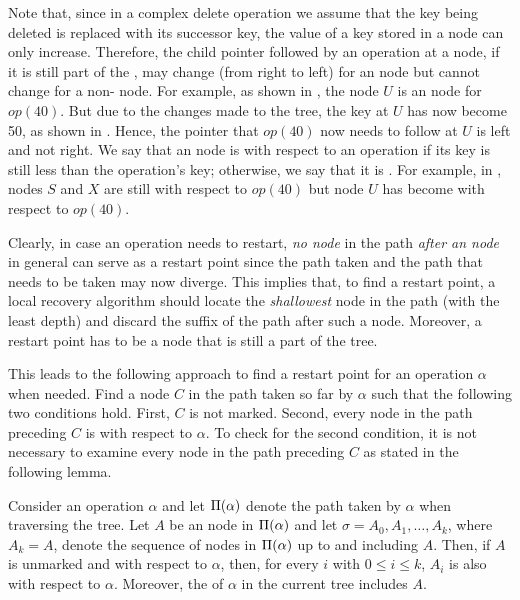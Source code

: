 Note that, since in a complex delete operation we assume that the key being deleted is replaced with its successor key, the value of a key stored in a node can only increase. Therefore, the child pointer followed by an operation at a node, if it is still part of the \accesspath, may change (from right to left) for an \myanchor{} node but cannot change for a non-\myanchor{} node. For example, as shown in , the node $U$ is an \myanchor{} node for $op(40)$. But due to the changes made to the tree, the key at $U$ has now become 50, as shown in . Hence, the pointer that $op(40)$ now needs to follow at $U$ is left and not right. We say that an \myanchor
{} node is \emph{\myconsistent} with respect to an operation if its key is still less than the operation's key; otherwise, we say that it is \emph{\myinconsistent}. For example, in , \myanchor{} nodes $S$ and $X$ are still \myconsistent{} with respect to $op(40)$ but node $U$ has become \myinconsistent{} with respect to $op(40)$. 

Clearly, in case an operation needs to restart, \emph{no node} in the path \emph{after an \myinconsistent{} \myanchor{} node} in general can serve as a restart point since the path taken and the path that needs to be taken may now diverge. This implies that, to find a restart point, a local recovery algorithm should locate the \emph{shallowest} \myinconsistent{} \myanchor{} node in the path (with the least depth) and discard the suffix of the path after such a node. Moreover, a restart point has to be a node that is still a part of the tree. 

This leads to the following approach to find a restart point for an operation $\alpha$ when needed. Find a node $C$ in the path taken so far by $\alpha$ such that the following two conditions hold. First, $C$ is not marked. Second, every \myanchor{} node in the path preceding $C$ is \myconsistent{} with respect to $\alpha$. To check for the second condition, it is not necessary to examine every \myanchor{} node in the path preceding $C$ as stated in the following lemma. 

\begin{lemma}
\label{lem:consistent}
Consider an operation $\alpha$ and let $\Pi(\alpha)$ denote the path 
taken by $\alpha$ when traversing the tree. 
Let $A$ be an \myanchor{} node in $\Pi(\alpha)$ and let 
$\sigma = A_0, A_1, \ldots, A_k$, where $A_k = A$, 
denote the sequence of \myanchor{} nodes in $\Pi(\alpha)$ up 
to and including $A$. Then, if $A$ is unmarked and \myconsistent{} with 
respect to $\alpha$, then, for every $i$ with $0 \leq i \leq k$, $A_i$ is 
also \myconsistent{} with respect to $\alpha$. Moreover, the \accesspath of $\alpha$ in the current tree includes $A$.
\end{lemma}

